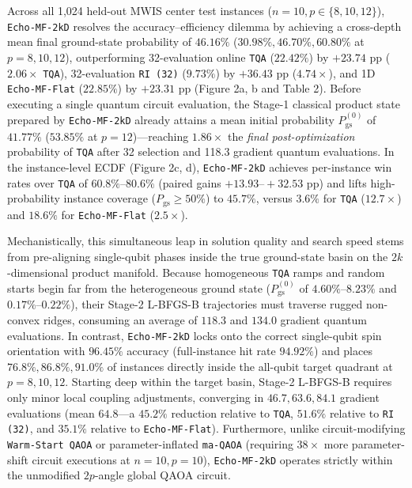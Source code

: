 \documentclass[10pt,a4paper]{article}
\begin{document}
Across all 1,024 held-out MWIS center test instances ($n=10, p \in \{8, 10, 12\}$), \texttt{Echo-MF-2kD} resolves the accuracy--efficiency dilemma by achieving a cross-depth mean final ground-state probability of $\mathbf{46.16}\%$ ($\mathbf{30.98}\%, \mathbf{46.70}\%, \mathbf{60.80}\%$ at $p=8, 10, 12$), outperforming 32-evaluation online \texttt{TQA} ($22.42\%$) by $\mathbf{+23.74}$ pp ($2.06\times$ \texttt{TQA}), 32-evaluation \texttt{RI (32)} ($9.73\%$) by $+36.43$ pp ($4.74\times$), and 1D \texttt{Echo-MF-Flat} ($22.85\%$) by $+23.31$ pp (Figure 2a, b and Table 2). Before executing a single quantum circuit evaluation, the Stage-1 classical product state prepared by \texttt{Echo-MF-2kD} already attains a mean initial probability $P_{\mathrm{gs}}^{(0)}$ of $\mathbf{41.77}\%$ ($\mathbf{53.85}\%$ at $p=12$)---reaching $1.86\times$ the \emph{final post-optimization} probability of \texttt{TQA} after 32 selection and 118.3 gradient quantum evaluations. In the instance-level ECDF (Figure 2c, d), \texttt{Echo-MF-2kD} achieves per-instance win rates over \texttt{TQA} of $60.8\%\mbox{--}80.6\%$ (paired gains $+13.93\mbox{--}{+}32.53$ pp) and lifts high-probability instance coverage ($P_{\mathrm{gs}} \ge 50\%$) to $\mathbf{45.7}\%$, versus $3.6\%$ for \texttt{TQA} ($12.7\times$) and $18.6\%$ for \texttt{Echo-MF-Flat} ($2.5\times$).

Mechanistically, this simultaneous leap in solution quality and search speed stems from pre-aligning single-qubit phases inside the true ground-state basin on the $2k$-dimensional product manifold. Because homogeneous \texttt{TQA} ramps and random starts begin far from the heterogeneous ground state ($P_{\mathrm{gs}}^{(0)}$ of $4.60\%\mbox{--}8.23\%$ and $0.17\%\mbox{--}0.22\%$), their Stage-2 L-BFGS-B trajectories must traverse rugged non-convex ridges, consuming an average of $118.3$ and $134.0$ gradient quantum evaluations. In contrast, \texttt{Echo-MF-2kD} locks onto the correct single-qubit spin orientation with $96.45\%$ accuracy (full-instance hit rate $94.92\%$) and places $76.8\%, 86.8\%, 91.0\%$ of instances directly inside the all-qubit target quadrant at $p=8, 10, 12$. Starting deep within the target basin, Stage-2 L-BFGS-B requires only minor local coupling adjustments, converging in $\mathbf{46.7, 63.6, 84.1}$ gradient evaluations (mean $\mathbf{64.8}$---a $\mathbf{45.2}\%$ reduction relative to \texttt{TQA}, $51.6\%$ relative to \texttt{RI (32)}, and $35.1\%$ relative to \texttt{Echo-MF-Flat}). Furthermore, unlike circuit-modifying \texttt{Warm-Start QAOA} \citep{egger2021warm,tate2023warm} or parameter-inflated \texttt{ma-QAOA} \citep{herrman2022multi} (requiring $38\times$ more parameter-shift circuit executions at $n=10, p=10$), \texttt{Echo-MF-2kD} operates strictly within the unmodified $2p$-angle global QAOA circuit.
\end{document}
